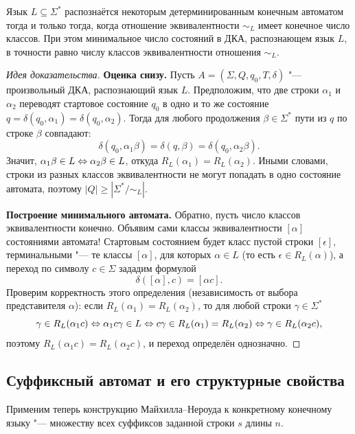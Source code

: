 \begin{theorem}
    Язык $L \subseteq \Sigma^*$ распознаётся некоторым детерминированным конечным автоматом тогда и только тогда, когда отношение эквивалентности $\sim_L$ имеет конечное число классов. При этом минимальное число состояний в ДКА, распознающем язык $L$, в точности равно числу классов эквивалентности отношения $\sim_L$.
\end{theorem}

\begin{proof}[Идея доказательства]
    \textbf{Оценка снизу.} Пусть $A = (\Sigma, Q, q_0, T, \delta)$ "--- произвольный ДКА, распознающий язык $L$. Предположим, что две строки $\alpha_1$ и $\alpha_2$ переводят стартовое состояние $q_0$ в одно и то же состояние $q = \delta(q_0, \alpha_1) = \delta(q_0, \alpha_2)$. Тогда для любого продолжения $\beta \in \Sigma^*$ пути из $q$ по строке $\beta$ совпадают:
    \[
        \delta(q_0, \alpha_1\beta) = \delta(q, \beta) = \delta(q_0, \alpha_2\beta).
    \]
    Значит, $\alpha_1\beta \in L \Leftrightarrow \alpha_2\beta \in L$, откуда $R_L(\alpha_1) = R_L(\alpha_2)$. Иными словами, строки из разных классов эквивалентности не могут попадать в одно состояние автомата, поэтому $|Q| \ge |\Sigma^* / {\sim_L}|$.

    \textbf{Построение минимального автомата.} Обратно, пусть число классов эквивалентности конечно. Объявим сами классы эквивалентности $[\alpha]$ состояниями автомата! Стартовым состоянием будет класс пустой строки $[\epsilon]$, терминальными "--- те классы $[\alpha]$, для которых $\alpha \in L$ (то есть $\epsilon \in R_L(\alpha)$), а переход по символу $c \in \Sigma$ зададим формулой
    \[
        \delta([\alpha], c) = [\alpha c].
    \]
    Проверим корректность этого определения (независимость от выбора представителя $\alpha$): если $R_L(\alpha_1) = R_L(\alpha_2)$, то для любой строки $\gamma \in \Sigma^*$
    \[
        \gamma \in R_L(\alpha_1 c) \Leftrightarrow \alpha_1 c \gamma \in L \Leftrightarrow c\gamma \in R_L(\alpha_1) = R_L(\alpha_2) \Leftrightarrow \gamma \in R_L(\alpha_2 c),
    \]
    поэтому $R_L(\alpha_1 c) = R_L(\alpha_2 c)$, и переход определён однозначно.
\end{proof}

\subsection{Суффиксный автомат и его структурные свойства}

Применим теперь конструкцию Майхилла--Нероуда к конкретному конечному языку "--- множеству всех суффиксов заданной строки $s$ длины $n$.

